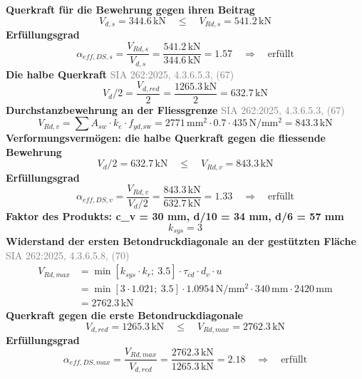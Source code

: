 \documentclass[11pt,a4paper]{article}
\newcommand{\normref}[1]{{\small\textcolor{gray}{#1}}}
\begin{document}
\noindent\textbf{Querkraft für die Bewehrung gegen ihren Beitrag}
\begin{equation*}
V_{d,s} = 344.6\,\mathrm{kN} \quad \le \quad V_{Rd,s} = 541.2\,\mathrm{kN}
\end{equation*}
\noindent\textbf{Erfüllungsgrad}
\begin{equation*}
\alpha_{eff,DS,s} = \frac{V_{Rd,s}}{V_{d,s}} = \frac{541.2\,\mathrm{kN}}{344.6\,\mathrm{kN}} = 1.57 \quad \Rightarrow \quad \text{erfüllt}
\end{equation*}
\noindent\textbf{Die halbe Querkraft} \hfill \normref{SIA 262:2025, 4.3.6.5.3, (67)}
\begin{equation*}
V_d / 2 = \frac{V_{d,red}}{2} = \frac{1265.3\,\mathrm{kN}}{2} = 632.7\,\mathrm{kN}
\end{equation*}
\noindent\textbf{Durchstanzbewehrung an der Fliessgrenze} \hfill \normref{SIA 262:2025, 4.3.6.5.3, (67)}
\begin{equation*}
V_{Rd,v} = \sum A_{sw} \cdot k_e \cdot f_{yd,\text{sw}} = 2771\,\mathrm{mm}^{2} \cdot 0.7 \cdot 435\,\mathrm{N}/\mathrm{mm}^{2} = 843.3\,\mathrm{kN}
\end{equation*}
\noindent\textbf{Verformungsvermögen: die halbe Querkraft gegen die fliessende Bewehrung}
\begin{equation*}
V_d / 2 = 632.7\,\mathrm{kN} \quad \le \quad V_{Rd,v} = 843.3\,\mathrm{kN}
\end{equation*}
\noindent\textbf{Erfüllungsgrad}
\begin{equation*}
\alpha_{eff,DS,v} = \frac{V_{Rd,v}}{V_d / 2} = \frac{843.3\,\mathrm{kN}}{632.7\,\mathrm{kN}} = 1.33 \quad \Rightarrow \quad \text{erfüllt}
\end{equation*}
\noindent\textbf{Faktor des Produkts: c\_v = 30 mm, d/10 = 34 mm, d/6 = 57 mm}
\begin{equation*}
k_{sys} = 3
\end{equation*}
\noindent\textbf{Widerstand der ersten Betondruckdiagonale an der gestützten Fläche} \hfill \normref{SIA 262:2025, 4.3.6.5.8, (70)}
\begin{equation*}
\begin{aligned}
  V_{Rd,max} &= \min\left[k_{sys} \cdot k_r;\ 3.5\right] \cdot \tau_{cd} \cdot d_v \cdot u \\
  &= \min\left[3 \cdot 1.021;\ 3.5\right] \cdot 1.0954\,\mathrm{N}/\mathrm{mm}^{2} \cdot 340\,\mathrm{mm} \cdot 2420\,\mathrm{mm} \\
  &= 2762.3\,\mathrm{kN}
\end{aligned}
\end{equation*}
\noindent\textbf{Querkraft gegen die erste Betondruckdiagonale}
\begin{equation*}
V_{d,red} = 1265.3\,\mathrm{kN} \quad \le \quad V_{Rd,max} = 2762.3\,\mathrm{kN}
\end{equation*}
\noindent\textbf{Erfüllungsgrad}
\begin{equation*}
\alpha_{eff,DS,max} = \frac{V_{Rd,max}}{V_{d,red}} = \frac{2762.3\,\mathrm{kN}}{1265.3\,\mathrm{kN}} = 2.18 \quad \Rightarrow \quad \text{erfüllt}
\end{equation*}
\end{document}
